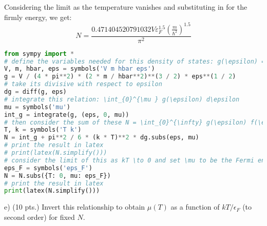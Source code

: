 \documentclass[12pt]{article}
\begin{document}
Considering the limit as the temperature vanishes and substituting in for the firmly energy, we get:
\begin{equation}
  N = \frac{0.471404520791032 V \varepsilon _{F}^{1.5} \left(\frac{m}{\hbar^{2}}\right)^{1.5}}{\pi^{2}}
\end{equation}
\begin{lstlisting}[language=Python]
from sympy import *
# define the variables needed for this density of states: g(\epsilon) = \frac{V}{4 \pi^2}\left(\frac{2 m}{\hbar^2}\right)^{3 / 2} \varepsilon^{1 / 2}
V, m, hbar, eps = symbols('V m hbar eps')
g = V / (4 * pi**2) * (2 * m / hbar**2)**(3 / 2) * eps**(1 / 2)
# take its divisive with respect to epsilon 
dg = diff(g, eps)
# integrate this relation: \int_{0}^{\mu } g(\epsilon) d\epsilon
mu = symbols('mu')
int_g = integrate(g, (eps, 0, mu))
# then consider the sum of these N = \int_{0}^{\infty} g(\epsilon) f(\epsilon, T) d\epsilon = \int_{0}^{\mu } g(\epsilon) d\epsilon + \frac{\pi^2}{6} (kT)^2 g^{\prime}(\mu) + \ldots
T, k = symbols('T k')
N = int_g + pi**2 / 6 * (k * T)**2 * dg.subs(eps, mu)
# print the result in latex
# print(latex(N.simplify()))
# consider the limit of this as kT \to 0 and set \mu to be the Fermi energy \varepsilon_F
eps_F = symbols('eps_F')
N = N.subs({T: 0, mu: eps_F})
# print the result in latex
print(latex(N.simplify()))
\end{lstlisting}
e) (10 pts.) Invert this relationship to obtain $\mu(T)$ as a function of $k T / \epsilon_{F}$ (to second order) for fixed $N$.
\end{document}

